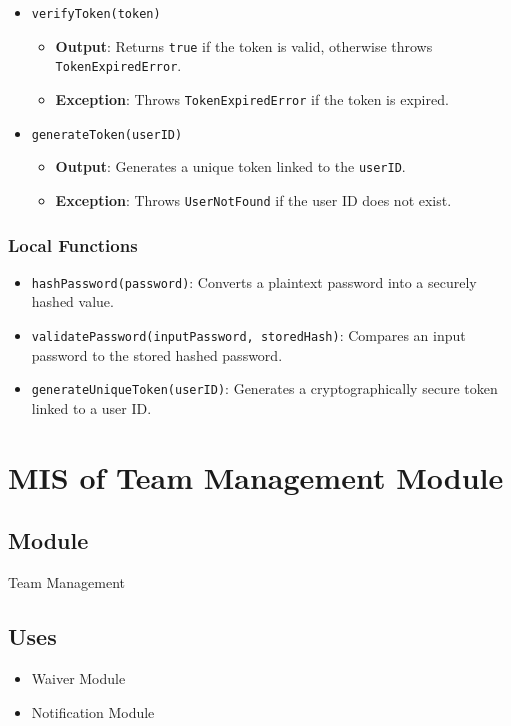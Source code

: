 \documentclass[12pt, titlepage]{article}
\begin{document}
\begin{itemize}
    \item \texttt{verifyToken(token)}
    \begin{itemize}
        \item \textbf{Output}: Returns \texttt{true} if the token is valid, otherwise throws \texttt{TokenExpiredError}.
        \item \textbf{Exception}: Throws \texttt{TokenExpiredError} if the token is expired.
    \end{itemize}

    \item \texttt{generateToken(userID)}
    \begin{itemize}
        \item \textbf{Output}: Generates a unique token linked to the \texttt{userID}.
        \item \textbf{Exception}: Throws \texttt{UserNotFound} if the user ID does not exist.
    \end{itemize}
\end{itemize}

\subsubsection{Local Functions}

\begin{itemize}
    \item \texttt{hashPassword(password)}: Converts a plaintext password into a securely hashed value.
    \item \texttt{validatePassword(inputPassword, storedHash)}: Compares an input password to the stored hashed password.
    \item \texttt{generateUniqueToken(userID)}: Generates a cryptographically secure token linked to a user ID.
\end{itemize}

\section{MIS of Team Management Module} \label{TeamManagementModule}

\subsection{Module}
Team Management

\subsection{Uses}
\begin{itemize}
    \item Waiver Module
    \item Notification Module
\end{itemize}
\end{document}
